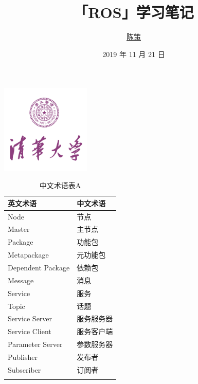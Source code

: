 \documentclass[geye,green,kindle,cn]{elegantnote}
\title{「ROS」学习笔记}
\author{\href{https://accelerator-blog.com}{陈策}}
\date{2019 年 11 月 21 日}
\begin{document}
\maketitle
\centerline{\includegraphics[width=0.32\textwidth]{src/TsinghuaLogo.pdf}}

\begin{table}
    \centering
    \caption{中文术语表A} \label{table:ChineseTermTableA}
    \begin{tabular}{p{80pt}<{\centering}p{80pt}<{\centering}}
    \Xhline{1.0pt}
    \textbf{英文术语} & 
    \textbf{中文术语} \\
    \hline
    Node &
    节点 \\
    Master &
    主节点 \\
    Package &
    功能包 \\
    Metapackage &
    元功能包 \\
    Dependent Package &
    依赖包 \\
    Message &
    消息 \\
    Service &
    服务 \\
    Topic &
    话题 \\
    Service Server &
    服务服务器 \\
    Service Client &
    服务客户端 \\
    Parameter Server &
    参数服务器 \\
    Publisher &
    发布者 \\
    Subscriber &
    订阅者 \\
    \Xhline{1.0pt}
    \end{tabular}
\end{table}
\end{document}
